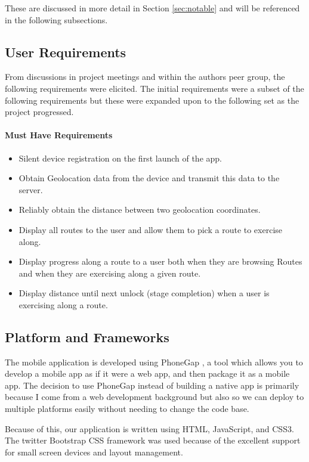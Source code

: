 These are discussed in more detail in Section \ref{sec:notable} and
will be referenced in the following subsections.

\subsection{User Requirements}
From discussions in project meetings and within the authors peer
group, the following requirements were elicited. The initial
requirements were a subset of the following requirements but these
were expanded upon to the following set as the project progressed.
\paragraph{Must Have Requirements}
\begin{itemize}
\item Silent device registration on the first launch of the app.
\item Obtain Geolocation data from the device and transmit this data
  to the server.
\item Reliably obtain the distance between two geolocation
  coordinates. 
\item Display all routes to the user and allow them to pick a route to
  exercise along.
\item Display progress along a route to a user both when they are
  browsing Routes and when they are exercising along a given route.
\item Display distance until next unlock (stage completion) when a
  user is exercising along a route.
\end{itemize} 


\subsection{Platform and Frameworks}
The mobile application is developed using PhoneGap \cite{phonegap}, 
a tool which allows you to develop a mobile app as if it were
a web app, and then package it as a mobile app. The decision to use
PhoneGap instead of building a native app is primarily because I come
from a web development background but also so we can deploy to
multiple platforms easily without needing to change the code base. 

Because of this, our application is written using HTML, JavaScript,
and CSS3. The twitter Bootstrap CSS framework \cite{bootstrap} was
used because of the excellent support for small screen devices and
layout management. 

